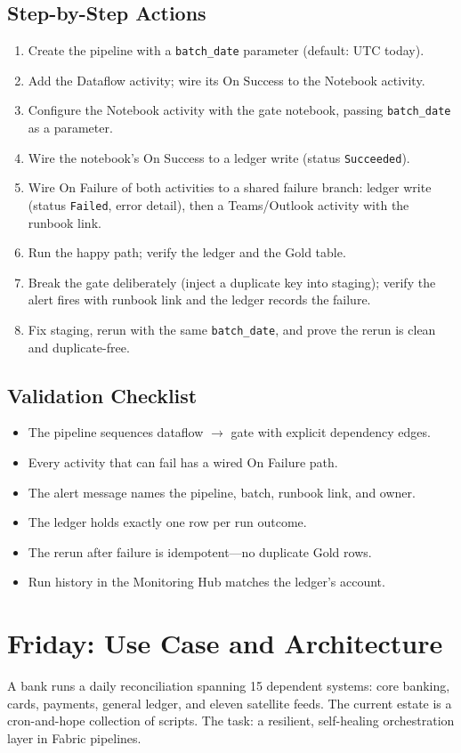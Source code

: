 \subsection{Step-by-Step Actions}
\begin{enumerate}
    \item Create the pipeline with a \texttt{batch\_date} parameter (default: UTC today).
    \item Add the Dataflow activity; wire its On Success to the Notebook activity.
    \item Configure the Notebook activity with the gate notebook, passing \texttt{batch\_date} as a parameter.
    \item Wire the notebook's On Success to a ledger write (status \texttt{Succeeded}).
    \item Wire On Failure of both activities to a shared failure branch: ledger write (status \texttt{Failed}, error detail), then a Teams/Outlook activity with the runbook link.
    \item Run the happy path; verify the ledger and the Gold table.
    \item Break the gate deliberately (inject a duplicate key into staging); verify the alert fires with runbook link and the ledger records the failure.
    \item Fix staging, rerun with the same \texttt{batch\_date}, and prove the rerun is clean and duplicate-free.
\end{enumerate}

\subsection{Validation Checklist}
\begin{itemize}
    \item The pipeline sequences dataflow $\rightarrow$ gate with explicit dependency edges.
    \item Every activity that can fail has a wired On Failure path.
    \item The alert message names the pipeline, batch, runbook link, and owner.
    \item The ledger holds exactly one row per run outcome.
    \item The rerun after failure is idempotent---no duplicate Gold rows.
    \item Run history in the Monitoring Hub matches the ledger's account.
\end{itemize}

\section{Friday: Use Case and Architecture}
A bank runs a daily reconciliation spanning 15 dependent systems: core banking, cards, payments, general ledger, and eleven satellite feeds. The current estate is a cron-and-hope collection of scripts. The task: a resilient, self-healing orchestration layer in Fabric pipelines.

